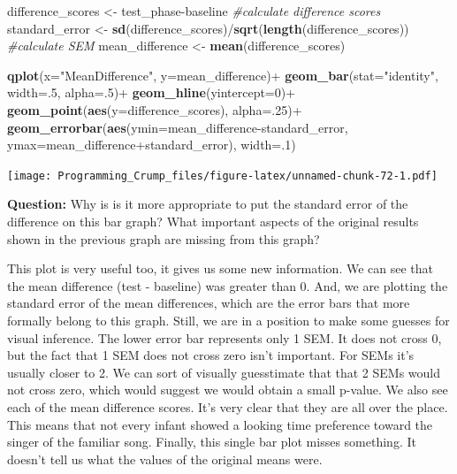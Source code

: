 \documentclass[]{book}
\newenvironment{Shaded}{\begin{snugshade}}{\end{snugshade}}
\newcommand{\KeywordTok}[1]{\textcolor[rgb]{0.13,0.29,0.53}{\textbf{{#1}}}}
\newcommand{\DataTypeTok}[1]{\textcolor[rgb]{0.13,0.29,0.53}{{#1}}}
\newcommand{\DecValTok}[1]{\textcolor[rgb]{0.00,0.00,0.81}{{#1}}}
\newcommand{\StringTok}[1]{\textcolor[rgb]{0.31,0.60,0.02}{{#1}}}
\newcommand{\CommentTok}[1]{\textcolor[rgb]{0.56,0.35,0.01}{\textit{{#1}}}}
\newcommand{\NormalTok}[1]{{#1}}
\theoremstyle{definition}
\theoremstyle{definition}
\theoremstyle{definition}
\theoremstyle{remark}
\begin{document}
\begin{Shaded}
\begin{Highlighting}[]
\NormalTok{difference_scores <-}\StringTok{ }\NormalTok{test_phase-baseline }\CommentTok{#calculate difference scores}
\NormalTok{standard_error <-}\StringTok{ }\KeywordTok{sd}\NormalTok{(difference_scores)/}\KeywordTok{sqrt}\NormalTok{(}\KeywordTok{length}\NormalTok{(difference_scores)) }\CommentTok{#calculate SEM}
\NormalTok{mean_difference <-}\StringTok{ }\KeywordTok{mean}\NormalTok{(difference_scores)}

\KeywordTok{qplot}\NormalTok{(}\DataTypeTok{x=}\StringTok{"MeanDifference"}\NormalTok{, }\DataTypeTok{y=}\NormalTok{mean_difference)+}
\StringTok{  }\KeywordTok{geom_bar}\NormalTok{(}\DataTypeTok{stat=}\StringTok{"identity"}\NormalTok{, }\DataTypeTok{width=}\NormalTok{.}\DecValTok{5}\NormalTok{, }\DataTypeTok{alpha=}\NormalTok{.}\DecValTok{5}\NormalTok{)+}
\StringTok{  }\KeywordTok{geom_hline}\NormalTok{(}\DataTypeTok{yintercept=}\DecValTok{0}\NormalTok{)+}
\StringTok{  }\KeywordTok{geom_point}\NormalTok{(}\KeywordTok{aes}\NormalTok{(}\DataTypeTok{y=}\NormalTok{difference_scores), }\DataTypeTok{alpha=}\NormalTok{.}\DecValTok{25}\NormalTok{)+}
\StringTok{  }\KeywordTok{geom_errorbar}\NormalTok{(}\KeywordTok{aes}\NormalTok{(}\DataTypeTok{ymin=}\NormalTok{mean_difference-standard_error, }
                                  \DataTypeTok{ymax=}\NormalTok{mean_difference+standard_error), }\DataTypeTok{width=}\NormalTok{.}\DecValTok{1}\NormalTok{)}
\end{Highlighting}
\end{Shaded}

\texttt{[image: Programming\_Crump\_files/figure-latex/unnamed-chunk-72-1.pdf]}

\textbf{Question:} Why is is it more appropriate to put the standard
error of the difference on this bar graph? What important aspects of the
original results shown in the previous graph are missing from this
graph?

This plot is very useful too, it gives us some new information. We can
see that the mean difference (test - baseline) was greater than 0. And,
we are plotting the standard error of the mean differences, which are
the error bars that more formally belong to this graph. Still, we are in
a position to make some guesses for visual inference. The lower error
bar represents only 1 SEM. It does not cross 0, but the fact that 1 SEM
does not cross zero isn't important. For SEMs it's usually closer to 2.
We can sort of visually guesstimate that that 2 SEMs would not cross
zero, which would suggest we would obtain a small p-value. We also see
each of the mean difference scores. It's very clear that they are all
over the place. This means that not every infant showed a looking time
preference toward the singer of the familiar song. Finally, this single
bar plot misses something. It doesn't tell us what the values of the
original means were.
\end{document}
